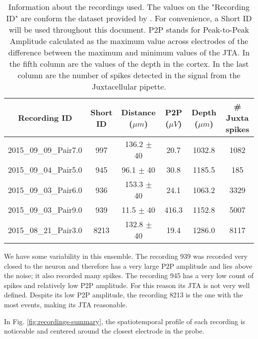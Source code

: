 \begin{table}[!h]
\centering
\begin{tabular}{cccccc}
\textbf{Recording ID} & \textbf{Short ID} & \textbf{Distance ($\mu m$) } & \textbf{P2P ($\mu V$)} & \textbf{Depth ($\mu m$)} & \textbf{\# Juxta spikes}\\ \hline
2015\_09\_09\_Pair7.0 & 997 & 136.2 $\pm$ 40 & 20.7 & 1032.8 & 1082  \\ 
2015\_09\_04\_Pair5.0 & 945 & 96.1 $\pm$ 40 & 30.8 & 1185.5 & 185  \\
2015\_09\_03\_Pair6.0 & 936 & 153.3 $\pm$  40 & 24.1 & 1063.2 & 3329 \\
2015\_09\_03\_Pair9.0 & 939 & 11.5 $\pm$  40 & 416.3 & 1152.8 & 5007  \\
2015\_08\_21\_Pair3.0 & 8213 & 132.8 $\pm$ 40 & 19.4 & 1286.0 & 8117 \\ 
\end{tabular}
\caption{Information about the recordings used. The values on the "Recording ID" are conform the dataset provided by \cite{Netoetal}. For convenience, a Short ID will be used throughout this document. P2P stands for Peak-to-Peak Amplitude calculated as the maximum value across electrodes of the difference between the maximum and minimum values of the JTA. In the fifth column are the values of the depth in the cortex. In the last column are the number of spikes detected in the signal from the Juxtacellular pipette.}
\label{tab:sum-recordings}
\end{table}
We have some variability in this ensemble. 
The recording 939 was recorded very closed to the neuron and therefore has a very large P2P amplitude and lies above the noise; it also recorded many spikes. 
The recording 945 has a very low count of spikes and relatively low P2P amplitude. For this reason its JTA is not very well defined.
Despite its low P2P amplitude, the recording 8213 is the one with the most events, making its JTA reasonable.

In Fig. \ref{fig:recordings-summary}, the spatiotemporal profile of each recording is noticeable and centered around the closest electrode in the probe.
